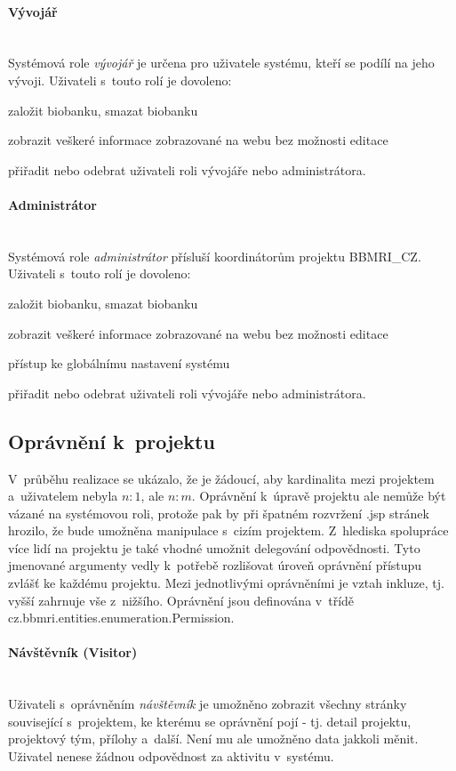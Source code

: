 \documentclass[11pt, draft, oneside]{fithesis2}
\newcommand{\paragraphNewLine}[1]{\paragraph*{#1}\mbox{}\\}
\newcommand{\ProjectName}{\mbox{BBMRI\_CZ}\xspace}
\begin{document}
\paragraphNewLine{Vývojář}
Systémová role \textit{vývojář} je určena pro uživatele systému, kteří se podílí na jeho vývoji.
Uživateli s~touto rolí je dovoleno:
\begin{compactitem}
	\item založit biobanku, smazat biobanku
	\item zobrazit veškeré informace zobrazované na webu bez možnosti editace
	\item přiřadit nebo odebrat uživateli roli vývojáře nebo administrátora.
\end{compactitem}

\paragraphNewLine{Administrátor}
Systémová role \textit{administrátor} přísluší koordinátorům projektu \ProjectName.
Uživateli s~touto rolí je dovoleno:
\begin{compactitem}
	\item založit biobanku, smazat biobanku
	\item zobrazit veškeré informace zobrazované na webu bez možnosti editace
	\item přístup ke globálnímu nastavení systému
	\item přiřadit nebo odebrat uživateli roli vývojáře nebo administrátora.
\end{compactitem}

\subsection{Oprávnění k~projektu}
V~průběhu realizace se ukázalo, že je žádoucí, aby kardinalita mezi projektem a~uživatelem nebyla $n:1$, ale $n:m$. Oprávnění k~úpravě projektu ale nemůže být vázané na systémovou roli, protože pak by při špatném rozvržení .jsp stránek hrozilo, že bude umožněna manipulace s~cizím projektem. Z~hlediska spolupráce více lidí na projektu je také vhodné umožnit delegování odpovědnosti. Tyto jmenované argumenty vedly k~potřebě rozlišovat úroveň oprávnění přístupu zvlášť ke každému projektu.
Mezi jednotlivými oprávněními je vztah inkluze, tj. vyšší zahrnuje vše z~nižšího. Oprávnění jsou definována v~třídě cz.bbmri.entities.enumeration.Permission.

\paragraphNewLine{Návštěvník (Visitor)} 
Uživateli s~oprávněním \textit{návštěvník} je umožněno zobrazit všechny stránky související s~projektem, ke kterému se oprávnění pojí - tj. detail projektu, projektový tým, přílohy a~další. Není mu ale umožněno data jakkoli měnit. Uživatel nenese žádnou odpovědnost za aktivitu v~systému.
\end{document}
